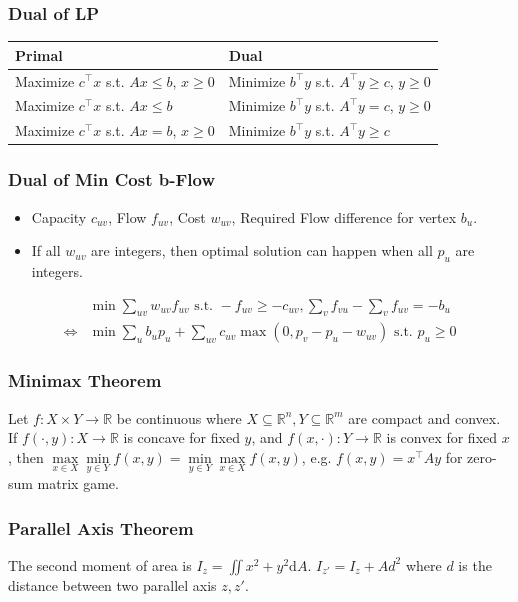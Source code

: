 \subsubsection{Dual of LP}

\begin{tabular}{|l|l|}
\hline
\textbf{Primal} & \textbf{Dual} \\
\hline
Maximize $c^\intercal x$ s.t. $Ax \leq b$, $x \geq 0$ & Minimize $b^\intercal y$ s.t. $A^\intercal y \geq c$, $y \geq 0$ \\
\hline
Maximize $c^\intercal x$ s.t. $Ax \leq b$ & Minimize $b^\intercal y$ s.t. $A^\intercal y = c$, $y \geq 0$ \\
\hline
Maximize $c^\intercal x$ s.t. $Ax = b$, $x \geq 0$ & Minimize $b^\intercal y$ s.t. $A^\intercal y \geq c$ \\
\hline
\end{tabular}

\subsubsection{Dual of Min Cost b-Flow}

\begin{itemize}
  \item Capacity $c_{uv}$, Flow $f_{uv}$, Cost $w_{uv}$, Required Flow difference for vertex $b_u$.
  \item If all $w_{uv}$ are integers, then optimal solution can happen when all $p_u$ are integers.
\end{itemize}
$$
\begin{aligned}
& \min\sum_{uv} w_{uv}f_{uv} 
\text{ s.t. } -f_{uv} \geq -c_{uv}, \sum_{v} f_{vu} - \sum_{v} f_{uv} = -b_u
\\
\Leftrightarrow
& \min\sum_{u} b_up_u + \sum_{uv}c_{uv}\max(0, p_v - p_u - w_{uv})
\text{ s.t. } p_u \geq 0
\end{aligned}
$$


\subsubsection{Minimax Theorem}
Let $f : X \times Y \to \mathbb R$ be continuous where $X \subseteq \mathbb R ^ n, Y \subseteq \mathbb R ^ m$ are compact and convex.
If $f(\cdot, y) : X \to \mathbb R$ is concave for fixed $y$, and
$f(x, \cdot) : Y \to \mathbb R$ is convex for fixed $x$,
then
$
\max\limits _{x\in X}\min\limits _{y\in Y}f(x,y)=\min\limits _{y\in Y}\max\limits _{x\in X}f(x,y)
$,
e.g. $f(x, y) = x^\intercal A y$ for zero-sum matrix game.

\subsubsection{Parallel Axis Theorem}
The second moment of area is $I_z = \iint x^2+y^2 \mathrm{d}A$.
$I_{z'} = I_z + Ad^2$ where $d$ is the distance between two parallel axis $z, z'$.
